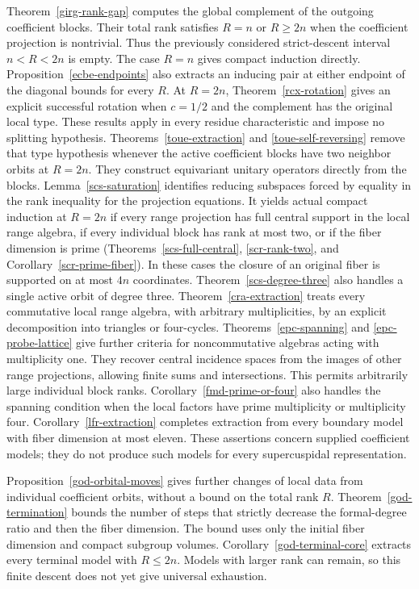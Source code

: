 \documentclass[10pt]{amsart}
\begin{document}
Theorem~\ref{girg-rank-gap} computes the global complement of the outgoing
coefficient blocks. Their total rank satisfies $R=n$ or $R\geq2n$ when
the coefficient projection is nontrivial. Thus the previously considered
strict-descent interval $n<R<2n$ is empty. The case $R=n$ gives compact
induction directly. Proposition~\ref{ecbe-endpoints} also extracts an
inducing pair at either endpoint of the diagonal bounds for every $R$.
At $R=2n$, Theorem~\ref{rcx-rotation} gives an explicit successful rotation
when $c=1/2$ and the complement has the original local type. These results
apply in every residue characteristic and impose no splitting hypothesis.
Theorems~\ref{toue-extraction} and \ref{toue-self-reversing} remove that
type hypothesis whenever the active coefficient blocks have two neighbor
orbits at $R=2n$. They construct equivariant unitary operators directly
from the blocks. Lemma~\ref{scs-saturation} identifies reducing subspaces
forced by equality in the rank inequality for the projection equations.
It yields actual compact induction at $R=2n$ if every range projection
has full central support in the local range algebra, if every individual
block has rank at most two, or if the fiber dimension is prime
(Theorems~\ref{scs-full-central}, \ref{scr-rank-two}, and
Corollary~\ref{scr-prime-fiber}). In these cases the closure of an original
fiber is supported on at most $4n$ coordinates. Theorem~\ref{scs-degree-three}
also handles a single active orbit of degree three.
Theorem~\ref{cra-extraction} treats every commutative local range algebra,
with arbitrary multiplicities, by an explicit decomposition into triangles
or four-cycles. Theorems~\ref{epc-spanning} and \ref{epc-probe-lattice} give
further criteria for noncommutative algebras acting with multiplicity one.
They recover central incidence spaces from the images of other range
projections, allowing finite sums and intersections. This permits arbitrarily
large individual block ranks. Corollary~\ref{fmd-prime-or-four} also handles
the spanning condition when the local factors have prime multiplicity or
multiplicity four. Corollary~\ref{lfr-extraction} completes extraction from
every boundary model with fiber dimension at most eleven.
These assertions concern supplied
coefficient models; they do not produce such models for every supercuspidal
representation.

Proposition~\ref{god-orbital-moves} gives further changes of local data from
individual coefficient orbits, without a bound on the total rank $R$.
Theorem~\ref{god-termination} bounds the number of steps that strictly
decrease the formal-degree ratio and then the fiber dimension. The bound
uses only the initial fiber dimension and compact subgroup volumes.
Corollary~\ref{god-terminal-core} extracts every terminal model with
$R\leq2n$. Models with larger rank can remain, so this finite descent
does not yet give universal exhaustion.
\end{document}
